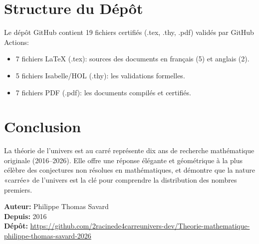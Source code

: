 \documentclass[12pt,a4paper]{article}
\begin{document}
\section{Structure du Dépôt}

Le dépôt GitHub contient 19 fichiers certifiés (.tex, .thy, .pdf) validés par
GitHub Actions:
\begin{itemize}
  \item 7 fichiers \LaTeX{} (.tex): sources des documents en français (5) et anglais (2).
  \item 5 fichiers Isabelle/HOL (.thy): les validations formelles.
  \item 7 fichiers PDF (.pdf): les documents compilés et certifiés.
\end{itemize}

\section{Conclusion}

La théorie de l'univers est au carré représente dix ans de recherche mathématique
originale (2016--2026). Elle offre une réponse élégante et géométrique à la plus
célèbre des conjectures non résolues en mathématiques, et démontre que la nature
«carrée» de l'univers est la clé pour comprendre la distribution des nombres premiers.

\bigskip
\noindent\textbf{Auteur:} Philippe Thomas Savard\\
\noindent\textbf{Depuis:} 2016\\
\noindent\textbf{Dépôt:} \url{https://github.com/2racinede4carreunivers-dev/Theorie-mathematique-philippe-thomas-savard-2026}
\end{document}
